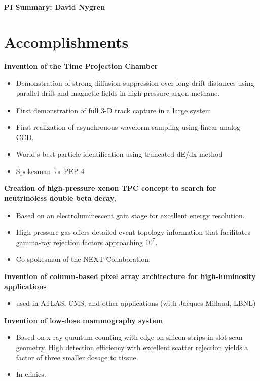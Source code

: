 
\begin{center}
\Large\textbf{PI Summary: David Nygren}
\end{center}


\section*{\textbf{Accomplishments}}


\noindent\textbf{Invention of the Time Projection Chamber}
\begin{itemize}[noitemsep,nolistsep]
\item{Demonstration of strong diffusion suppression over long drift distances using parallel drift and magnetic fields in high-pressure argon-methane.}
\item{First demonstration of full 3-D track capture in a large system}
\item{First realization of asynchronous waveform sampling using linear analog CCD.}
\item{World’s best particle identification using truncated dE/dx method}
\item{Spokesman for PEP-4}
\end{itemize}


\noindent\textbf{Creation of high-pressure xenon TPC concept to search for neutrinoless double beta decay}, 
\begin{itemize}[noitemsep,nolistsep]
\item{Based on an electroluminescent gain stage for excellent energy resolution.}
\item{High-pressure gas offers detailed event topology information that facilitates gamma-ray rejection factors approaching $10^7$.}
\item{Co-spokesman of the NEXT Collaboration.}
\end{itemize}

\noindent\textbf{Invention of column-based pixel array architecture for high-luminosity applications}
\begin{itemize}[noitemsep,nolistsep]
\item{used in ATLAS, CMS, and other applications (with Jacques Millaud, LBNL)}
\end{itemize}

\noindent\textbf{Invention of low-dose mammography system} 
\begin{itemize}[noitemsep,nolistsep]
\item{Based on x-ray quantum-counting with edge-on silicon strips in slot-scan geometry. High detection efficiency with excellent scatter rejection yields a factor of three smaller dosage to tissue.}
\item{In clinics.}
\end{itemize}

